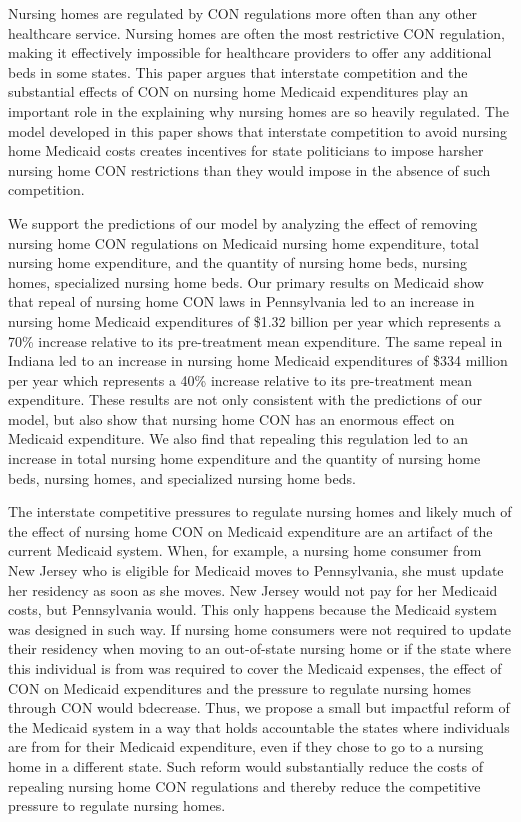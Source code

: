 \documentclass[../Main.tex]{subfiles}
\begin{document}
Nursing homes are regulated by CON regulations more often than any other healthcare service. Nursing homes are often the most restrictive CON regulation, making it effectively impossible for healthcare providers to offer any additional beds in some states. This paper argues that interstate competition and the substantial effects of CON on nursing home Medicaid expenditures play an important role in the explaining why nursing homes are so heavily regulated. The model developed in this paper shows that interstate competition to avoid nursing home Medicaid costs creates incentives for state politicians to impose harsher nursing home CON restrictions than they would impose in the absence of such competition.

We support the predictions of our model by analyzing the effect of removing nursing home CON regulations on Medicaid nursing home expenditure, total nursing home expenditure, and the quantity of nursing home beds, nursing homes, specialized nursing home beds. Our primary results on Medicaid show that repeal of nursing home CON laws in Pennsylvania led to an increase in nursing home Medicaid expenditures of \$1.32 billion per year which represents a 70\% increase relative to its pre-treatment mean expenditure. The same repeal in Indiana led to an increase in nursing home Medicaid expenditures of \$334 million per year which represents a 40\% increase relative to its pre-treatment mean expenditure. These results are not only consistent with the predictions of our model, but also show that nursing home CON has an enormous effect on Medicaid expenditure. We also find that repealing this regulation led to an increase in total nursing home expenditure and the quantity of nursing home beds, nursing homes, and specialized nursing home beds.

The interstate competitive pressures to regulate nursing homes and likely much of the effect of nursing home CON on Medicaid expenditure are an artifact of the current Medicaid system. When, for example, a nursing home consumer from New Jersey who is eligible for Medicaid moves to Pennsylvania, she must update her residency as soon as she moves. New Jersey would not pay for her Medicaid costs, but Pennsylvania would. This only happens because the Medicaid system was designed in such way. If nursing home consumers were not required to update their residency when moving to an out-of-state nursing home or if the state where this individual is from was required to cover the Medicaid expenses, the effect of CON on Medicaid expenditures and the pressure to regulate nursing homes through CON would bdecrease.  Thus, we propose a small but impactful reform of the Medicaid system in a way that holds accountable the states where individuals are from for their Medicaid expenditure, even if they chose to go to a nursing home in a different state. Such reform would substantially reduce the costs of repealing nursing home CON regulations and thereby reduce the competitive pressure to regulate nursing homes. 
\end{document}
